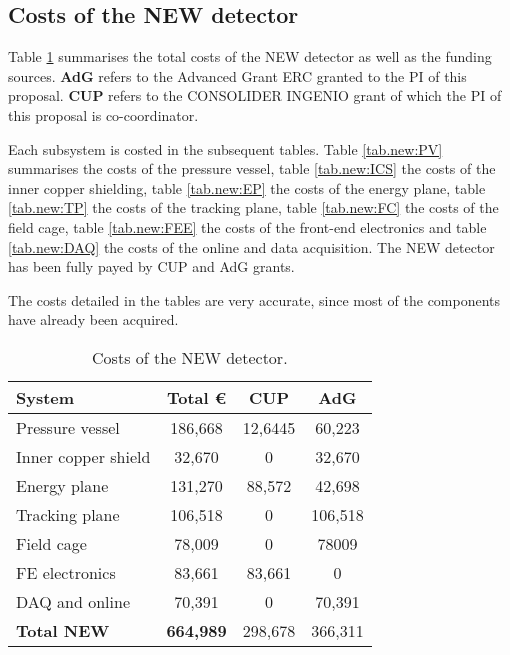 \subsection{Costs of the NEW detector}
Table \ref{tab.new:DET} summarises the total costs of the NEW detector as well as the funding sources. {\bf AdG} refers to the Advanced Grant ERC granted to the PI of this proposal. {\bf CUP} refers to the CONSOLIDER INGENIO grant of which the PI of this proposal is co-coordinator.

Each subsystem is costed in the subsequent tables. Table \ref{tab.new:PV} summarises the costs of the pressure vessel, 
table \ref{tab.new:ICS} the costs of the inner copper shielding,
table \ref{tab.new:EP} the costs of the energy plane,
table \ref{tab.new:TP} the costs of the tracking plane,
table \ref{tab.new:FC} the costs of the field cage,
table \ref{tab.new:FEE} the costs of the front-end electronics and
table \ref{tab.new:DAQ} the costs of the online and data acquisition. The NEW detector has
been fully payed by CUP and AdG grants.

The costs detailed in the tables are very accurate, since most of the components have already been acquired. 
  
\begin{table}[h!]
\begin{center}
\begin{tabular}{|l|c|c|c|}
\hline
 System & Total \euro & CUP & AdG  \\
 \hline
 Pressure vessel 	& 186,668 &	12,6445 &	60,223 \\
Inner copper shield	& 32,670	& 0 &	32,670 \\
Energy plane	& 131,270 &	88,572 &	42,698 \\
Tracking plane	& 106,518 &	0 &	106,518  \\
Field cage	& 78,009 &	0 &	78009 \\
FE electronics &	83,661 &	83,661 &	0\\
DAQ and online &	70,391 &	0 &	70,391 \\
 \hline
{\bf Total NEW} &	{\bf 664,989 }& 	298,678 & 	366,311 \\	
 \hline\hline
\end{tabular}  
\caption{Costs of the NEW detector.}
\label{tab.new:DET}
\end{center}
\end{table} 

